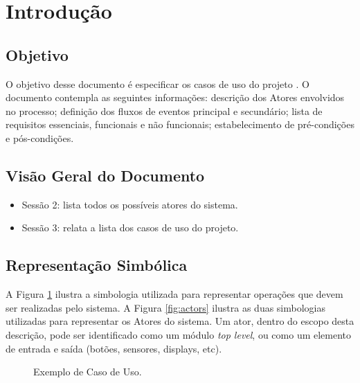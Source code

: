\section{Introdução}

  \subsection{Objetivo}
  O objetivo desse documento é especificar os casos de uso do projeto \ipPROCESSProject. O documento contempla as seguintes informações: descrição dos Atores envolvidos no processo; definição dos fluxos de eventos principal e secundário; lista de requisitos essenciais, funcionais e não funcionais; estabelecimento de pré-condições e pós-condições.

  \subsection{Visão Geral do Documento}
  \begin{itemize}
    \item Sessão 2: lista todos os possíveis atores do sistema.
    \item Sessão 3: relata a lista dos casos de uso do projeto.
  \end{itemize}
  
  \subsection{Representação Simbólica}
  A Figura \ref{fig:uc_exemple} ilustra a simbologia utilizada para representar operações que devem ser realizadas pelo sistema. A Figura \ref{fig:actors} ilustra as duas simbologias utilizadas para representar os Atores do sistema. Um ator, dentro do escopo desta descrição, pode ser identificado como um módulo \textit{top level}, ou como um elemento de entrada e saída (botões, sensores, displays, etc).
  
    \begin{figure}[H]
      \centering
      \caption{Exemplo de Caso de Uso.}
      \label{fig:uc_exemple}
    \end{figure}
  
